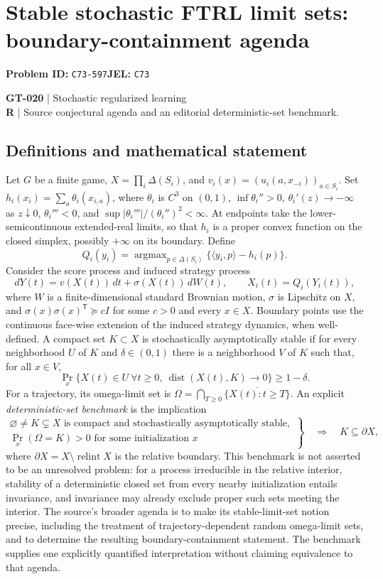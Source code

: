 \documentclass[11pt,a4paper]{article}
\begin{document}
\section*{Stable stochastic FTRL limit sets: boundary-containment agenda}
\textbf{Problem ID:} \texttt{C73-597}\quad \textbf{JEL:} \texttt{C73}\par
\label{problem:OP-0150}
\label{game:GT-020}
{\sffamily\small\color{muted}
\textbf{GT-020} | Stochastic regularized learning\\
\textbf{R} | Source conjectural agenda and an editorial deterministic-set benchmark.
\par}
\subsection*{Definitions and mathematical statement}
Let $G$ be a finite game, $X=\prod_i\Delta(S_i)$, and $v_i(x)=(u_i(a,x_{-i}))_{a\in S_i}$. Set $h_i(x_i)=\sum_a\theta_i(x_{i,a})$, where $\theta_i$ is $C^3$ on $(0,1)$, $\inf\theta_i''>0$, $\theta_i'(z)\to-\infty$ as $z\downarrow0$, $\theta_i'''<0$, and $\sup|\theta_i'''|/(\theta_i'')^2<\infty$. At endpoints take the lower-semicontinuous extended-real limits, so that $h_i$ is a proper convex function on the closed simplex, possibly $+\infty$ on its boundary. Define
\[
 Q_i(y_i)=\operatorname{argmax}_{p\in\Delta(S_i)}
 \{\langle y_i,p\rangle-h_i(p)\}.
\]
Consider the score process and induced strategy process
\[
 dY(t)=v(X(t))\,dt+\sigma(X(t))\,dW(t),\qquad X_i(t)=Q_i(Y_i(t)),
\]
where $W$ is a finite-dimensional standard Brownian motion, $\sigma$ is Lipschitz on $X$, and $\sigma(x)\sigma(x)^{\mathsf T}\succeq cI$ for some $c>0$ and every $x\in X$. Boundary points use the continuous face-wise extension of the induced strategy dynamics, when well-defined.
A compact set $K\subset X$ is stochastically asymptotically stable if for every neighborhood $U$ of $K$ and $\delta\in(0,1)$ there is a neighborhood $V$ of $K$ such that, for all $x\in V$,
\[
 \Pr_x\{X(t)\in U\ \forall t\geq0,\ \operatorname{dist}(X(t),K)\to0\}\geq1-\delta.
\]
For a trajectory, its omega-limit set is $\Omega=\bigcap_{T\geq0}\overline{\{X(t):t\geq T\}}$. An explicit \emph{deterministic-set benchmark} is the implication
\[
 \left.
 \begin{gathered}
 \varnothing\ne K\subsetneq X\text{ is compact and stochastically asymptotically stable},\\
 \Pr_x(\Omega=K)>0\text{ for some initialization }x
 \end{gathered}\right\}
 \quad\Longrightarrow\quad K\subseteq\partial X,
\]
where $\partial X=X\setminus\operatorname{relint}X$ is the relative boundary. This benchmark is not asserted to be an unresolved problem: for a process irreducible in the relative interior, stability of a deterministic closed set from every nearby initialization entails invariance, and invariance may already exclude proper such sets meeting the interior. The source's broader agenda is to make its stable-limit-set notion precise, including the treatment of trajectory-dependent random omega-limit sets, and to determine the resulting boundary-containment statement. The benchmark supplies one explicitly quantified interpretation without claiming equivalence to that agenda.
\end{document}
